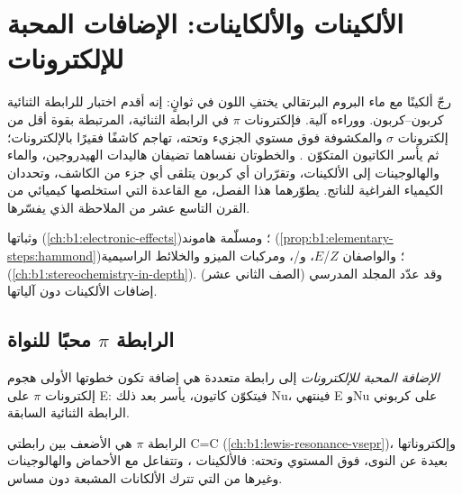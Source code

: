 \chapter{الألكينات والألكاينات: الإضافات المحبة للإلكترونات}\label{ch:b1:electrophilic-additions}

رجّ ألكينًا مع ماء البروم البرتقالي يختفِ اللون في
ثوانٍ: إنه أقدم اختبار للرابطة الثنائية كربون--كربون. ووراءه
آلية. فإلكترونات $\pi$ في الرابطة الثنائية، المرتبطة بقوة أقل من
إلكترونات $\sigma$ والمكشوفة فوق مستوي الجزيء وتحته،
تهاجم كاشفًا فقيرًا بالإلكترونات؛ ثم يأسر الكاتيون المتكوّن
. والخطوتان نفساهما تضيفان هاليدات الهيدروجين، والماء
والهالوجينات إلى الألكينات، وتقرّران أي كربون يتلقى أي جزء من
الكاشف، وتحددان الكيمياء الفراغية للناتج. يطوّرهما هذا الفصل،
مع القاعدة التي استخلصها كيميائي من القرن التاسع عشر من
الملاحظة  الذي يفسّرها.

\begin{recall}
 وثباتها  (\cref{ch:b1:electronic-effects})؛
ومسلّمة هاموند (\cref{prop:b1:elementary-steps:hammond})؛ والواصفان $Z$/$E$،
و/، ومركبات الميزو والخلائط الراسيمية
(\cref{ch:b1:stereochemistry-in-depth}). وقد عدّد المجلد المدرسي (الصف الثاني عشر)
إضافات الألكينات دون آلياتها.
\end{recall}

\section{الرابطة \texorpdfstring{$\pi$}{pi} محبًا للنواة}

\begin{definition}\label{def:b1:electrophilic-additions:electrophilic-addition}
\emph{الإضافة المحبة للإلكترونات} إلى
رابطة متعددة هي إضافة تكون خطوتها الأولى هجوم
إلكترونات $\pi$ على  E: فيتكوّن كاتيون، يأسر بعد ذلك
 Nu، فينتهي E وNu على كربوني
الرابطة الثنائية السابقة.
\end{definition}

الرابطة $\pi$ هي الأضعف بين رابطتي C=C (\cref{ch:b1:lewis-resonance-vsepr})،
وإلكتروناتها بعيدة عن النوى، فوق المستوي وتحته:
فالألكينات ، وتتفاعل مع الأحماض والهالوجينات وغيرها من
 التي تترك الألكانات المشبعة دون مساس.

